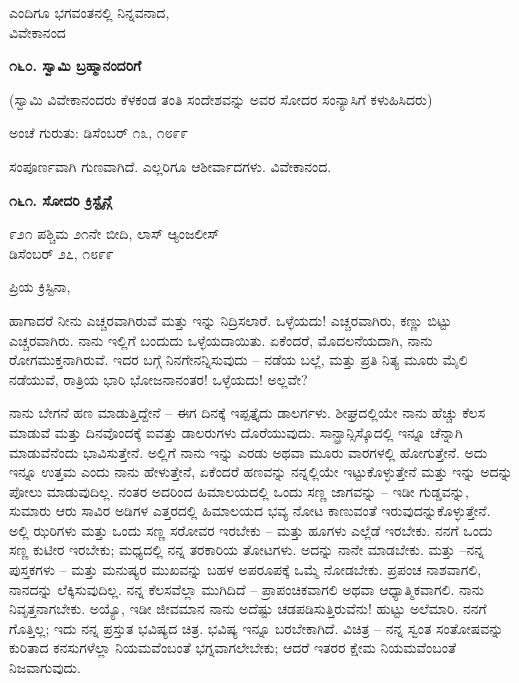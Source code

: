 \begin{flushright}
ಎಂದಿಗೂ ಭಗವಂತನಲ್ಲಿ ನಿನ್ನವನಾದ,\\ವಿವೇಕಾನಂದ
\end{flushright}

\begin{center}
\textbf{೧೬೦. ಸ್ವಾಮಿ ಬ್ರಹ್ಮಾನಂದರಿಗೆ}
\end{center}

\begin{center}
(ಸ್ವಾಮಿ ವಿವೇಕಾನಂದರು ಕೆಳಕಂಡ ತಂತಿ ಸಂದೇಶವನ್ನು ಅವರ ಸೋದರ ಸಂನ್ಯಾಸಿಗೆ ಕಳುಹಿಸಿದರು)
\end{center}

\begin{flushright}
ಅಂಚೆ ಗುರುತು: ಡಿಸೆಂಬರ್ ೧೩, ೧೮೯೯
\end{flushright}

ಸಂಪೂರ್ಣವಾಗಿ ಗುಣವಾಗಿದೆ. ಎಲ್ಲರಿಗೂ ಆಶೀರ್ವಾದಗಳು. ವಿವೇಕಾನಂದ.

\begin{center}
\textbf{೧೬೧. ಸೋದರಿ ಕ್ರಿಸ್ಟೈನ್ಗೆ}
\end{center}

\begin{flushright}
೯೨೧ ಪಶ್ಚಿಮ ೨೧ನೇ ಬೀದಿ, ಲಾಸ್ ಆ್ಯಂಜಲೀಸ್\\ಡಿಸೆಂಬರ್ ೨೭, ೧೮೯೯
\end{flushright}

ಪ್ರಿಯ ಕ್ರಿಸ್ಟಿನಾ,

ಹಾಗಾದರೆ ನೀನು ಎಚ್ಚರವಾಗಿರುವೆ ಮತ್ತು ಇನ್ನು ನಿದ್ರಿಸಲಾರೆ. ಒಳ್ಳೆಯದು! ಎಚ್ಚರವಾಗಿರು, ಕಣ್ಣು ಬಿಟ್ಟು ಎಚ್ಚರವಾಗಿರು. ನಾನು ಇಲ್ಲಿಗೆ ಬಂದುದು ಒಳ್ಳೆಯದಾಯಿತು. ಏಕೆಂದರೆ, ಮೊದಲನೆಯದಾಗಿ, ನಾನು ರೋಗಮುಕ್ತನಾಗಿರುವೆ. ಇದರ ಬಗ್ಗೆ ನಿನಗೇನನ್ನಿಸುವುದು – ನಡೆಯ ಬಲ್ಲೆ, ಮತ್ತು ಪ್ರತಿ ನಿತ್ಯ ಮೂರು ಮೈಲಿ ನಡೆಯುವೆ, ರಾತ್ರಿಯ ಭಾರಿ ಭೋಜನಾನಂತರ! ಒಳ್ಳೆಯದು! ಅಲ್ಲವೇ?

ನಾನು ಬೇಗನೆ ಹಣ ಮಾಡುತ್ತಿದ್ದೇನೆ – ಈಗ ದಿನಕ್ಕೆ ಇಪ್ಪತ್ತೈದು ಡಾಲರ್ಗಳು. ಶೀಘ್ರದಲ್ಲಿಯೇ ನಾನು ಹೆಚ್ಚು ಕೆಲಸ ಮಾಡುವೆ ಮತ್ತು ದಿನವೊಂದಕ್ಕೆ ಐವತ್ತು ಡಾಲರುಗಳು ದೊರೆಯುವುದು. ಸಾನ್ಫ್ರಾನ್ಸಿಸ್ಕೊದಲ್ಲಿ ಇನ್ನೂ ಚೆನ್ನಾಗಿ ಮಾಡುವೆನೆಂದು ಭಾವಿಸುತ್ತೇನೆ. ಅಲ್ಲಿಗೆ ನಾನು ಇನ್ನು ಎರಡು ಅಥವಾ ಮೂರು ವಾರಗಳಲ್ಲಿ ಹೋಗುತ್ತೇನೆ. ಅದು ಇನ್ನೂ ಉತ್ತಮ ಎಂದು ನಾನು ಹೇಳುತ್ತೇನೆ, ಏಕೆಂದರೆ ಹಣವನ್ನು ನನ್ನಲ್ಲಿಯೇ ಇಟ್ಟುಕೊಳ್ಳುತ್ತೇನೆ ಮತ್ತು ಇನ್ನು ಅದನ್ನು ಪೋಲು ಮಾಡುವುದಿಲ್ಲ. ನಂತರ ಅದರಿಂದ ಹಿಮಾಲಯದಲ್ಲಿ ಒಂದು ಸಣ್ಣ ಜಾಗವನ್ನು – ಇಡೀ ಗುಡ್ಡವನ್ನು, ಸುಮಾರು ಆರು ಸಾವಿರ ಅಡಿಗಳ ಎತ್ತರದಲ್ಲಿ ಹಿಮಾಲಯದ ಭವ್ಯ ನೋಟ ಕಾಣುವಂತೆ ಇರುವುದನ್ನುಕೊಳ್ಳುತ್ತೇನೆ. ಅಲ್ಲಿ ಝರಿಗಳು ಮತ್ತು ಒಂದು ಸಣ್ಣ ಸರೋವರ ಇರಬೇಕು – ಮತ್ತು ಹೂಗಳು ಎಲ್ಲೆಡೆ ಇರಬೇಕು. ನನಗೆ ಒಂದು ಸಣ್ಣ ಕುಟೀರ ಇರಬೇಕು; ಮಧ್ಯದಲ್ಲಿ ನನ್ನ ತರಕಾರಿಯ ತೋಟಗಳು. ಅದನ್ನು ನಾನೇ ಮಾಡಬೇಕು. ಮತ್ತು –ನನ್ನ ಪುಸ್ತಕಗಳು – ಮತ್ತು ಮನುಷ್ಯರ ಮುಖವನ್ನು ಬಹಳ ಅಪರೂಪಕ್ಕೆ ಒಮ್ಮೆ ನೋಡಬೇಕು. ಪ್ರಪಂಚ ನಾಶವಾಗಲಿ, ನಾನದನ್ನು ಲೆಕ್ಕಿಸುವುದಿಲ್ಲ. ನನ್ನ ಕೆಲಸವೆಲ್ಲಾ ಮುಗಿದಿದೆ – ಪ್ರಾಪಂಚಿಕವಾಗಲಿ ಅಥವಾ ಆಧ್ಯಾತ್ಮಿಕವಾಗಲಿ. ನಾನು ನಿವೃತ್ತನಾಗಬೇಕು. ಅಯ್ಯೊ, ಇಡೀ ಜೀವಮಾನ ನಾನು ಅದೆಷ್ಟು ಚಡಪಡಿಸುತ್ತಿರುವೆನು! ಹುಟ್ಟು ಅಲೆಮಾರಿ. ನನಗೆ ಗೊತ್ತಿಲ್ಲ; ಇದು ನನ್ನ ಪ್ರಸ್ತುತ ಭವಿಷ್ಯದ ಚಿತ್ರ. ಭವಿಷ್ಯ ಇನ್ನೂ ಬರಬೇಕಾಗಿದೆ. ವಿಚಿತ್ರ – ನನ್ನ ಸ್ವಂತ ಸಂತೋಷವನ್ನು ಕುರಿತಾದ ಕನಸುಗಳೆಲ್ಲಾ ನಿಯಮವೆಂಬಂತೆ ಭಗ್ನವಾಗಲೇಬೇಕು; ಆದರೆ ಇತರರ ಕ್ಷೇಮ ನಿಯಮವೆಂಬಂತೆ ನಿಜವಾಗುವುದು.

